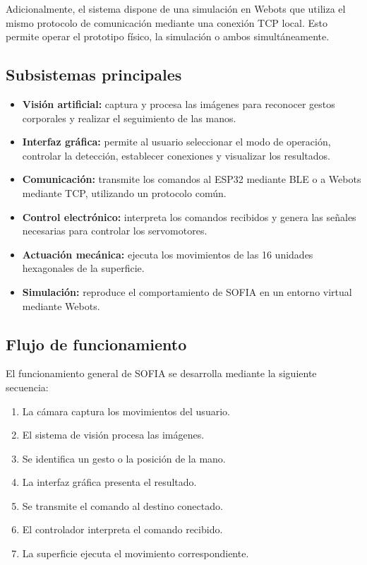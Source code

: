\documentclass[letterpaper,journal]{IEEEtran}
\begin{document}
Adicionalmente, el sistema dispone de una simulación en
Webots que utiliza el mismo protocolo de comunicación
mediante una conexión TCP local. Esto permite operar el
prototipo físico, la simulación o ambos simultáneamente.

\subsection{Subsistemas principales}

\begin{itemize}
    \item \textbf{Visión artificial:} captura y procesa las
    imágenes para reconocer gestos corporales y realizar
    el seguimiento de las manos.

    \item \textbf{Interfaz gráfica:} permite al usuario
    seleccionar el modo de operación, controlar la detección,
    establecer conexiones y visualizar los resultados.

    \item \textbf{Comunicación:} transmite los comandos al
    ESP32 mediante BLE o a Webots mediante TCP, utilizando
    un protocolo común.

    \item \textbf{Control electrónico:} interpreta los
    comandos recibidos y genera las señales necesarias
    para controlar los servomotores.

    \item \textbf{Actuación mecánica:} ejecuta los movimientos
    de las 16 unidades hexagonales de la superficie.

    \item \textbf{Simulación:} reproduce el comportamiento
    de SOFIA en un entorno virtual mediante Webots.
\end{itemize}

\subsection{Flujo de funcionamiento}

El funcionamiento general de SOFIA se desarrolla mediante
la siguiente secuencia:

\begin{enumerate}
    \item La cámara captura los movimientos del usuario.
    \item El sistema de visión procesa las imágenes.
    \item Se identifica un gesto o la posición de la mano.
    \item La interfaz gráfica presenta el resultado.
    \item Se transmite el comando al destino conectado.
    \item El controlador interpreta el comando recibido.
    \item La superficie ejecuta el movimiento correspondiente.
\end{enumerate}
\end{document}
